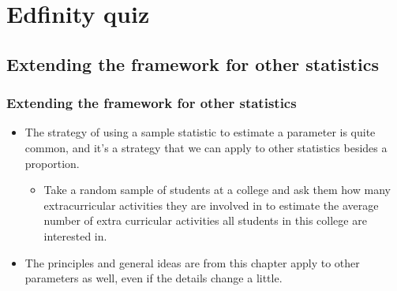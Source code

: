 \documentclass[t,compress,mathserif]{beamer}
\begin{document}

\section{Edfinity quiz}



\subsection{Extending the framework for other statistics}


\begin{frame}
\frametitle{Extending the framework for other statistics}

\begin{itemize}

\item The strategy of using a sample statistic to estimate a parameter is quite common, and it's a strategy that we can apply to other statistics besides a proportion.

\begin{itemize}
\item Take a random sample of students at a college and ask them how many extracurricular activities they are involved in to estimate the average number of extra curricular activities all students in this college are interested in.
\end{itemize}

\item The principles and general ideas are from this chapter apply to other parameters as well, even if the details change a little. 

\end{itemize}

\end{frame}

\end{document}
